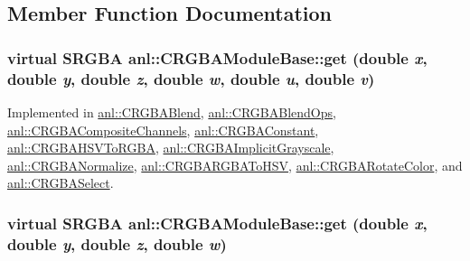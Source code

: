 \subsection{Member Function Documentation}
\hypertarget{classanl_1_1CRGBAModuleBase_aa5a0b719101302596a697aa8c2292f55}{
\subsubsection[{get}]{\setlength{\rightskip}{0pt plus 5cm}virtual {\bf SRGBA} anl::CRGBAModuleBase::get (double {\em x}, \/  double {\em y}, \/  double {\em z}, \/  double {\em w}, \/  double {\em u}, \/  double {\em v})}}
\label{classanl_1_1CRGBAModuleBase_aa5a0b719101302596a697aa8c2292f55}


Implemented in \hyperlink{classanl_1_1CRGBABlend_a2bb566fe4302196bc650ad36048bee15}{anl::CRGBABlend}, \hyperlink{classanl_1_1CRGBABlendOps_a313f936098a144fcd1bf9acc8bd60ac6}{anl::CRGBABlendOps}, \hyperlink{classanl_1_1CRGBACompositeChannels_a2597ea3895f3389a713fbe79232ffeff}{anl::CRGBACompositeChannels}, \hyperlink{classanl_1_1CRGBAConstant_ae1d83d837656a78bc42106768d911b83}{anl::CRGBAConstant}, \hyperlink{classanl_1_1CRGBAHSVToRGBA_adb2d92c8bc56e5996580e111bb8cd703}{anl::CRGBAHSVToRGBA}, \hyperlink{classanl_1_1CRGBAImplicitGrayscale_a047141373ae0ae8f3bcafc8664301956}{anl::CRGBAImplicitGrayscale}, \hyperlink{classanl_1_1CRGBANormalize_a3cf10a459e0340cd687676580b42383d}{anl::CRGBANormalize}, \hyperlink{classanl_1_1CRGBARGBAToHSV_ae1e0c7aad9142812d8df07f6c1102c00}{anl::CRGBARGBAToHSV}, \hyperlink{classanl_1_1CRGBARotateColor_a2a41a9e088707832997a0a515bf87e19}{anl::CRGBARotateColor}, and \hyperlink{classanl_1_1CRGBASelect_ab01b30f5f625045abec088065028a11c}{anl::CRGBASelect}.\hypertarget{classanl_1_1CRGBAModuleBase_ab94523074ef298bb99f0830051e78c1c}{
\subsubsection[{get}]{\setlength{\rightskip}{0pt plus 5cm}virtual {\bf SRGBA} anl::CRGBAModuleBase::get (double {\em x}, \/  double {\em y}, \/  double {\em z}, \/  double {\em w})}}
\label{classanl_1_1CRGBAModuleBase_ab94523074ef298bb99f0830051e78c1c}



